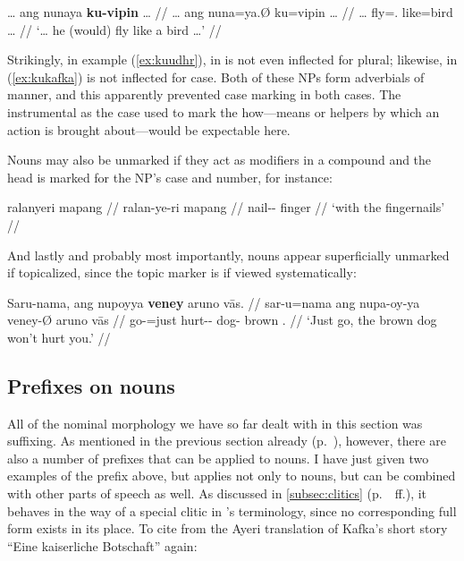 \a\label{ex:kukafka}\begingl
	\gla … ang nunaya \textbf{ku-vipin} … //
	\glb … ang nuna=ya.Ø ku=vipin … //
	\glc … \AgtT{} fly=\TsgM{}.\Top{} like=bird … //
	\glft `… he (would) fly like a bird …'%
	//
\endgl

\xe


Strikingly, in example (\ref{ex:kuudhr}),  in 
 is not even inflected for plural;
likewise,  in (\ref{ex:kukafka}) is not
inflected for case. Both of these NPs form adverbials of manner, and this
apparently prevented case marking in both cases. The instrumental as the case
used to mark the how---means or helpers by which an action is brought about---would be expectable here.

Nouns may also be unmarked if they act as modifiers in a compound and the head 
is marked for the NP's case and number, for instance:

\ex\begingl
	\gla ralanyeri mapang //
	\glb ralan-ye-ri mapang //
	\glc nail-\Pl{}-\Ins{} finger //
	\glft `with the fingernails' //
\endgl\xe

And lastly and probably most importantly, nouns appear superficially unmarked 
if topicalized, since the topic marker is  if viewed systematically:

\ex\begingl
	\gla Saru-nama, ang nupoyya \textbf{veney} aruno vās. //
	\glb sar-u=nama ang nupa-oy-ya veney-Ø aruno vās //
	\glc go-\Imp{}=just \AgtT{} hurt-\Neg{}-\TsgM{} dog-\Top{} brown 
		\Ssg{}.\Parg{} //
	\glft `Just go, the brown dog won't hurt you.' //
\endgl\xe


\subsection{Prefixes on nouns}
\label{subsec:nounpref}

All of the nominal morphology we have so far dealt with in this section was
suffixing. As mentioned in the previous section already
(p.~\pageref{nounprefixes}), however, there are also a number of prefixes that
can be applied to nouns. I have just given two examples of the prefix
 above, but  applies not only
to nouns, but can be combined with other parts of speech as well. As discussed
in \autoref{subsec:clitics} (p.~\pageref{clitics_prenoun_ku}~ff.), it behaves 
in the way of a special clitic in \citet{zwicky1977}'s terminology, since no
corresponding full form exists in its place. To cite from the Ayeri
translation of Kafka's short story \enquote{Eine kaiserliche Botschaft} again:

